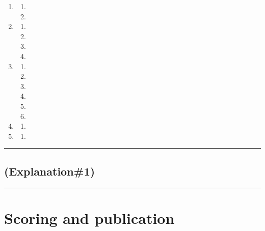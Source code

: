 \documentclass[draft]{report}
\newenvironment{expl}[0]%
  {\rule{\textwidth}{.2pt}\footnotesize}%
  {\rule{\textwidth}{.2pt}\normalsize}
\begin{document}
\begin{enumerate}
\item

    \begin{enumerate}
    \item
    
    \item
    
    \end{enumerate}
\item

    \begin{enumerate}
    \item
    
    \item
    
    \item
    
    \item
    
    \end{enumerate}
\item

    \begin{enumerate}
    \item
    
    \item
    
    \item
    
    \item
    
    \item
    
    \item
    
    \end{enumerate}
\item

    \begin{enumerate}
    \item
    
    \end{enumerate}
\item

    \begin{enumerate}
    \item
    
    \end{enumerate}
\end{enumerate}

\begin{expl}
\section{(Explanation\#1)}


\end{expl}


\chapter{Scoring and publication}\label{scoring-and-publication}
\end{document}
